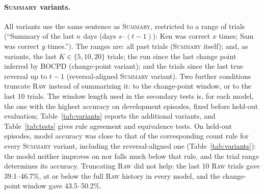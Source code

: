 \documentclass[letterpaper]{article} %
\newcommand{\Raw}{\textsc{Raw}}
\newcommand{\Summary}{\textsc{Summary}}
\begin{document}
\paragraph{\Summary{} variants.} All variants use the same sentence as \Summary{}, restricted to a range of trials (``Summary of the last $n$ days (days $s$--$(t-1)$): Ken was correct $x$ times; Sam was correct $y$ times.''). The ranges are: all past trials (\Summary{} itself); and, as variants, the last $K \in \{5, 10, 20\}$ trials; the run since the last change point inferred by BOCPD (change-point variant); and the trials since the last true reversal up to $t-1$ (reversal-aligned \Summary{} variant). Two further conditions truncate \Raw{} instead of summarizing it: to the change-point window, or to the last 10 trials. The window length used in the secondary tests is, for each model, the one with the highest accuracy on development episodes, fixed before held-out evaluation; Table~\ref{tab:variants} reports the additional variants, and Table~\ref{tab:tests} gives rule agreement and equivalence tests. On held-out episodes, model accuracy was close to that of the corresponding count rule for every \Summary{} variant, including the reversal-aligned one (Table~\ref{tab:variants}): the model neither improves on nor falls much below that rule, and the trial range determines its accuracy. Truncating \Raw{} did not help: the last 10 \Raw{} trials gave 39.1--46.7\%, at or below the full \Raw{} history in every model, and the change-point window gave 43.5--50.2\%.
\end{document}
